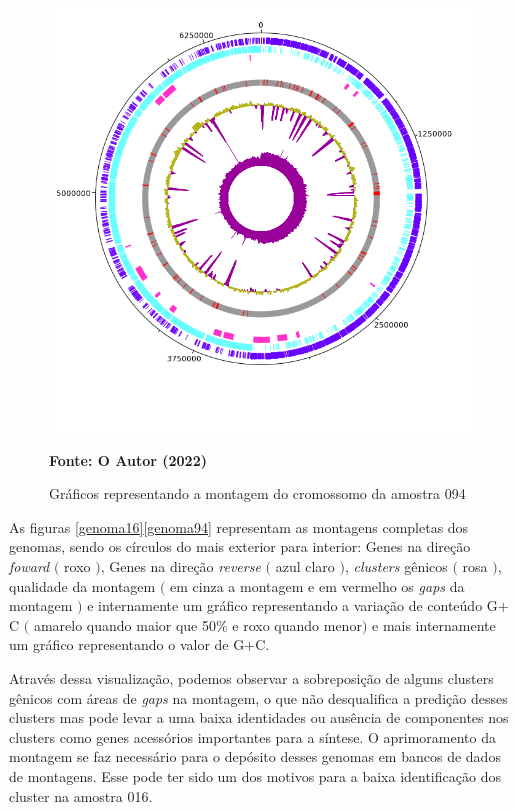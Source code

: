 \begin{figure}[H]
	\caption{Gráficos representando a montagem do cromossomo da amostra 094}
	\label{fig:genoma94}
	\centering
	\includegraphics[width=0.8\linewidth]{imagens/genome/004.png} \\
	\centering
    \begin{small}\textbf{Fonte: O Autor (2022)}\end{small}
\end{figure}
\vspace{\floatsep}

As figuras \ref{genoma16}\ref{genoma94} representam as montagens completas dos genomas, sendo
os círculos do mais exterior para interior: Genes na direção \textit{foward} $($ roxo $)$,
Genes na direção \textit{reverse} $($ azul claro $)$, \textit{clusters} gênicos $($ rosa $)$,
qualidade da montagem $($ em cinza a montagem e em vermelho os \textit{gaps} da montagem $)$ e internamente 
um gráfico representando a variação de conteúdo G$+$C $($ amarelo quando maior que 50\% e roxo quando menor$)$ e
mais internamente um gráfico representando o valor de G$+$C. 

Através dessa visualização, podemos observar a sobreposição de alguns clusters gênicos com áreas
de \textit{gaps} na montagem, o que não desqualifica a predição desses clusters mas pode levar
a uma baixa identidades ou ausência de componentes nos clusters como genes acessórios importantes
para a síntese. O aprimoramento da montagem se faz necessário para o depósito desses genomas em 
bancos de dados de montagens. Esse pode ter sido um dos motivos para a baixa identificação dos
cluster na amostra 016.